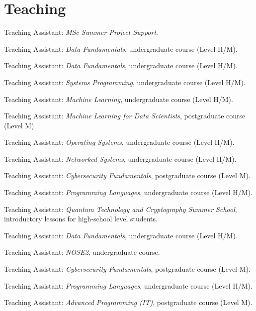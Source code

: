 \section{Teaching}
\begin{cvitemize}[2020--2021]
	\item Teaching Assistant: \emph{MSc Summer Project Support}.
	\item Teaching Assistant: \emph{Data Fundamentals}, undergraduate course (Level H/M).
\end{cvitemize}
\begin{cvitemize}[2019--2020]
	\item Teaching Assistant: \emph{Data Fundamentals}, undergraduate course (Level H/M).
	\item Teaching Assistant: \emph{Systems Programming}, undergraduate course (Level H/M).
	\item Teaching Assistant: \emph{Machine Learning}, undergraduate course (Level H/M).
	\item Teaching Assistant: \emph{Machine Learning for Data Scientists}, postgraduate course (Level M).
	\item Teaching Assistant: \emph{Operating Systems}, undergraduate course (Level H/M).
	\item Teaching Assistant: \emph{Networked Systems}, undergraduate course (Level H/M).
	\item Teaching Assistant: \emph{Cybersecurity Fundamentals}, postgraduate course (Level M).
	\item Teaching Assistant: \emph{Programming Languages}, undergraduate course (Level H/M).
\end{cvitemize}
\begin{cvitemize}[2018--2019]
	\item Teaching Assistant: \emph{Quantum Technology and Cryptography Summer School}, introductory lessons for high-school level students.
	\item Teaching Assistant: \emph{Data Fundamentals}, undergraduate course (Level H/M).
	\item Teaching Assistant: \emph{NOSE2}, undergraduate course.
	\item Teaching Assistant: \emph{Cybersecurity Fundamentals}, postgraduate course (Level M).
	\item Teaching Assistant: \emph{Programming Languages}, undergraduate course (Level H/M).
\end{cvitemize}
\begin{cvitemize}[2017--2018]
	\item Teaching Assistant: \emph{Advanced Programming (IT)}, postgraduate course (Level M).
\end{cvitemize}
